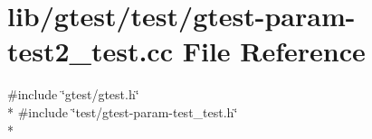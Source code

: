 \hypertarget{gtest-param-test2__test_8cc}{\section{lib/gtest/test/gtest-\/param-\/test2\-\_\-test.cc File Reference}
\label{gtest-param-test2__test_8cc}
}
{\ttfamily \#include \char`\"{}gtest/gtest.\-h\char`\"{}}\\*
{\ttfamily \#include \char`\"{}test/gtest-\/param-\/test\-\_\-test.\-h\char`\"{}}\\*
